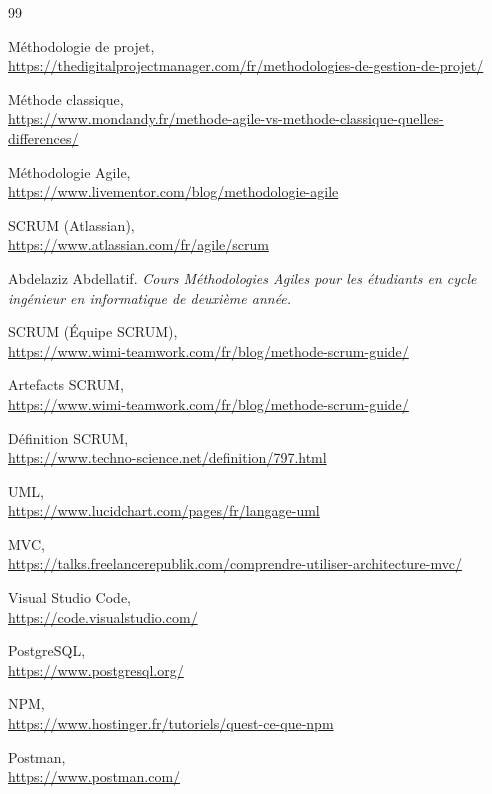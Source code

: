
\pagestyle{empty}
\small
\begin{thebibliography}{99}
\vspace*{-3cm}

 Méthodologie de projet,\\
\url{https://thedigitalprojectmanager.com/fr/methodologies-de-gestion-de-projet/}

 Méthode classique,\\
\url{https://www.mondandy.fr/methode-agile-vs-methode-classique-quelles-differences/}

 Méthodologie Agile,\\
\url{https://www.livementor.com/blog/methodologie-agile}

 SCRUM (Atlassian),\\
\url{https://www.atlassian.com/fr/agile/scrum}

 Abdelaziz Abdellatif. \textit{Cours Méthodologies Agiles pour les étudiants en cycle ingénieur en informatique de deuxième année.}

 SCRUM (Équipe SCRUM),\\
\url{https://www.wimi-teamwork.com/fr/blog/methode-scrum-guide/}

 Artefacts SCRUM,\\
\url{https://www.wimi-teamwork.com/fr/blog/methode-scrum-guide/}

 Définition SCRUM,\\
\url{https://www.techno-science.net/definition/797.html}

 UML,\\
\url{https://www.lucidchart.com/pages/fr/langage-uml}

 MVC,\\
\url{https://talks.freelancerepublik.com/comprendre-utiliser-architecture-mvc/}

 Visual Studio Code,\\
\url{https://code.visualstudio.com/}

 PostgreSQL,\\
\url{https://www.postgresql.org/}

 NPM,\\
\url{https://www.hostinger.fr/tutoriels/quest-ce-que-npm}

 Postman,\\
\url{https://www.postman.com/}


\end{thebibliography}
